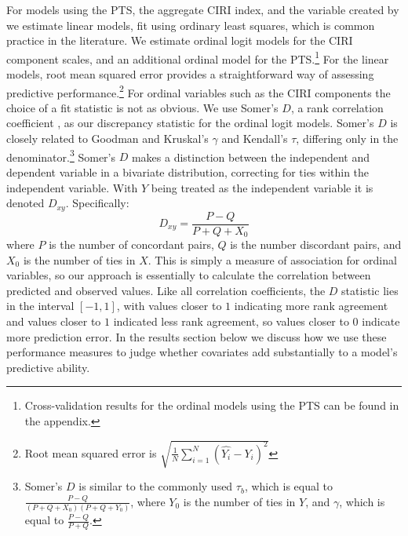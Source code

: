 \documentclass[11pt]{article}
\begin{document}
For models using the PTS, the aggregate CIRI index, and the variable created by \citet{Fariss2013} we estimate linear models, fit using ordinary least squares, which is common practice in the literature. We estimate ordinal logit models for the CIRI component scales, and an additional ordinal model for the PTS.\footnote{Cross-validation results for the ordinal models using the PTS can be found in the appendix.} For the linear models, root mean squared error provides a straightforward way of assessing predictive performance.\footnote{Root mean squared error is $\displaystyle \sqrt{\frac{1}{N} \sum\limits_{i=1}^N (\hat{Y_{i}} - Y_{i})^2} $} For ordinal variables such as the CIRI components the choice of a fit statistic is not as obvious. We use Somer's $D$, a rank correlation coefficient  \citep{Somers1962}, as our discrepancy statistic for the ordinal logit models.
Somer's $D$ is closely related to Goodman and Kruskal's $\gamma$ and Kendall's $\tau$, differing only in the denominator.\footnote{Somer's $D$ is similar to the commonly used $\tau_b$, which is equal to $\frac{P - Q}{(P+Q+X_0)(P+Q+Y_0)}$, where $Y_0$ is the number of ties in $Y$, and $\gamma$, which is equal to $\frac{P - Q}{P + Q}$.} Somer's $D$ makes a distinction between the independent and dependent variable in a bivariate distribution, correcting for ties within the independent variable. With $Y$ being treated as the independent variable it is denoted $D_{xy}$. 
Specifically:
$$D_{xy} = \frac{P - Q}{P + Q + X_0}$$
\noindent where $P$ is the number of concordant pairs, $Q$ is the number discordant pairs, and $X_0$ is the number of ties in $X$. This is simply a measure of association for ordinal variables, so our approach is essentially to calculate the correlation between predicted and observed values. Like all correlation coefficients, the $D$ statistic lies in the interval $[-1, 1]$, with values closer to $1$ indicating more rank agreement and values closer to $1$ indicated less rank agreement, so values closer to 0 indicate more prediction error. In the results section below we discuss how we use these performance measures to judge whether covariates add substantially to a model's predictive ability.
\end{document}
